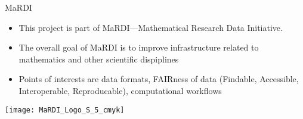\begin{frame}{MaRDI}
  \begin{itemize}
    \item This project is part of MaRDI---Mathematical Research Data Initiative.
    \item The overall goal of MaRDI is to improve infrastructure related
          to mathematics and other scientific dispiplines
    \item Points of interests are data formats, FAIRness of data
          (Findable, Accessible, Interoperable, Reproducable), computational
          workflows
  \end{itemize}
  \vspace{-2cm}
  \texttt{[image: MaRDI\_Logo\_S\_5\_cmyk]}
\end{frame}
